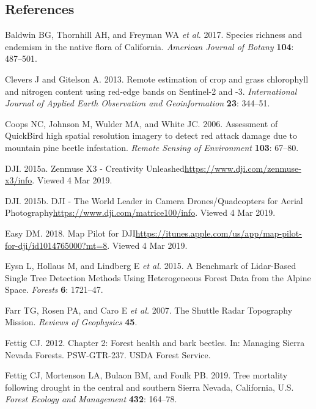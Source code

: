 \documentclass[]{article}
\begin{document}
\subsection*{References}\label{references}

\hypertarget{refs}{}
\hypertarget{ref-baldwin2017a}{}
Baldwin BG, Thornhill AH, and Freyman WA \emph{et al.} 2017. Species
richness and endemism in the native flora of California. \emph{American
Journal of Botany} \textbf{104}: 487--501.

\hypertarget{ref-clevers2013}{}
Clevers J and Gitelson A. 2013. Remote estimation of crop and grass
chlorophyll and nitrogen content using red-edge bands on Sentinel-2 and
-3. \emph{International Journal of Applied Earth Observation and
Geoinformation} \textbf{23}: 344--51.

\hypertarget{ref-coops2006}{}
Coops NC, Johnson M, Wulder MA, and White JC. 2006. Assessment of
QuickBird high spatial resolution imagery to detect red attack damage
due to mountain pine beetle infestation. \emph{Remote Sensing of
Environment} \textbf{103}: 67--80.

\hypertarget{ref-dji2015}{}
DJI. 2015a. Zenmuse X3 - Creativity
Unleashed\url{https://www.dji.com/zenmuse-x3/info}. Viewed 4 Mar 2019.

\hypertarget{ref-dji2015a}{}
DJI. 2015b. DJI - The World Leader in Camera Drones/Quadcopters for
Aerial Photography\url{https://www.dji.com/matrice100/info}. Viewed 4
Mar 2019.

\hypertarget{ref-dronesmadeeasy2018}{}
Easy DM. 2018. ‎Map Pilot for
DJI\url{https://itunes.apple.com/us/app/map-pilot-for-dji/id1014765000?mt=8}.
Viewed 4 Mar 2019.

\hypertarget{ref-eysn2015}{}
Eysn L, Hollaus M, and Lindberg E \emph{et al.} 2015. A Benchmark of
Lidar-Based Single Tree Detection Methods Using Heterogeneous Forest
Data from the Alpine Space. \emph{Forests} \textbf{6}: 1721--47.

\hypertarget{ref-farr2007}{}
Farr TG, Rosen PA, and Caro E \emph{et al.} 2007. The Shuttle Radar
Topography Mission. \emph{Reviews of Geophysics} \textbf{45}.

\hypertarget{ref-fettig2012b}{}
Fettig CJ. 2012. Chapter 2: Forest health and bark beetles. In: Managing
Sierra Nevada Forests. PSW-GTR-237. USDA Forest Service.

\hypertarget{ref-fettig2019}{}
Fettig CJ, Mortenson LA, Bulaon BM, and Foulk PB. 2019. Tree mortality
following drought in the central and southern Sierra Nevada, California,
U.S. \emph{Forest Ecology and Management} \textbf{432}: 164--78.
\end{document}

